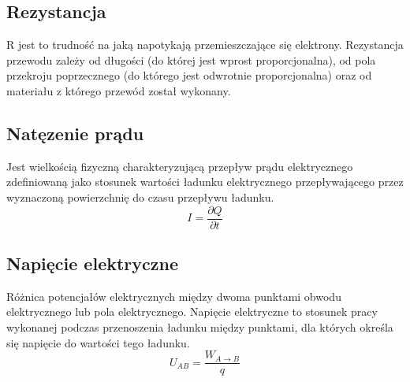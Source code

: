 \documentclass{article}
\begin{document}
\subsection{Rezystancja}
R jest to trudność na jaką napotykają przemieszczające się elektrony. Rezystancja przewodu zależy od długości (do której jest wprost proporcjonalna), od pola przekroju poprzecznego (do którego jest odwrotnie proporcjonalna) oraz od materiału z którego przewód został wykonany.
\subsection{Natęzenie prądu}
Jest wielkością fizyczną charakteryzującą przepływ prądu elektrycznego zdefiniowaną jako stosunek wartości ładunku elektrycznego przepływającego przez wyznaczoną powierzchnię do czasu przepływu ładunku.
$$ I = \frac{\partial Q}{\partial t} $$
\subsection{Napięcie elektryczne}
Różnica potencjałów elektrycznych między dwoma punktami obwodu elektrycznego lub pola elektrycznego. Napięcie elektryczne to stosunek pracy wykonanej podczas przenoszenia ładunku między punktami, dla których określa się napięcie do wartości tego ładunku.
$$ U_{AB} = \frac{W_{A\rightarrow B}}{q}$$
\end{document}
